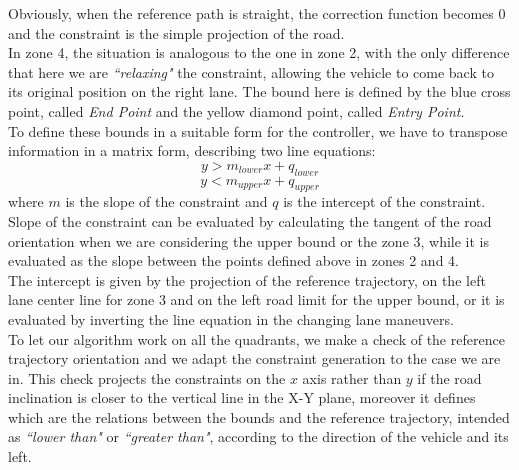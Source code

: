 Obviously, when the reference path is straight, the correction function becomes 0 and the constraint is the simple projection of the road.\\
In zone 4, the situation is analogous to the one in zone 2, with the only difference that here we are \textit{``relaxing"} the constraint, allowing the vehicle to come back to its original position on the right lane. The bound here is defined by the blue cross point, called \textit{End Point} and the yellow diamond point, called \textit{Entry Point}.\\
To define these bounds in a suitable form for the controller, we have to transpose information in a matrix form, describing two line equations:
\begin{equation}
    y > m_{lower}x + q_{lower}
\end{equation}
\begin{equation}
    y < m_{upper}x + q_{upper}
\end{equation}
where $m$ is the slope of the constraint and $q$ is the intercept of the constraint.
Slope of the constraint can be evaluated by calculating the tangent of the road orientation when we are considering the upper bound or the zone 3, while it is evaluated as the slope between the points defined above in zones 2 and 4.\\
The intercept is given by the projection of the reference trajectory, on the left lane center line for zone 3 and on the left road limit for the upper bound, or it is evaluated by inverting the line equation in the changing lane maneuvers.\\
To let our algorithm work on all the quadrants, we make a check of the reference trajectory orientation and we adapt the constraint generation to the case we are in. This check projects the constraints on the $x$ axis rather than $y$ if the road inclination is closer to the vertical line in the X-Y plane, moreover it defines which are the relations between the bounds and the reference trajectory, intended as \textit{``lower than"} or \textit{``greater than"}, according to the direction of the vehicle and its left.


